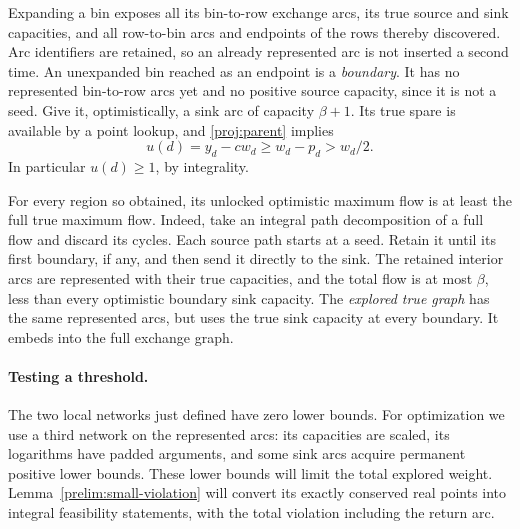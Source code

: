 Expanding a bin exposes all its bin-to-row exchange arcs, its true
source and sink capacities, and all row-to-bin arcs and endpoints of
the rows thereby discovered.  Arc identifiers are retained, so an
already represented arc is not inserted a second time.  An
unexpanded bin reached as an endpoint is a \emph{boundary}.  It has
no represented bin-to-row arcs yet and no positive source capacity,
since it is not a seed.  Give it, optimistically, a sink arc of
capacity \(\beta+1\).  Its true spare is available by a point lookup,
and \eqref{proj:parent} implies
\begin{equation}
\label{proj:boundary-spare}
            u(d)=y_d-cw_d\ge w_d-p_d>w_d/2 .
\end{equation}
In particular \(u(d)\ge1\), by integrality.

For every region so obtained, its unlocked optimistic maximum flow
is at least the full true maximum flow.  Indeed, take an integral
path decomposition of a full flow and discard its cycles.  Each
source path starts at a seed.  Retain it until its first boundary,
if any, and then send it directly to the sink.  The retained
interior arcs are represented with their true capacities, and the
total flow is at most \(\beta\), less than every optimistic boundary
sink capacity.  The \emph{explored true graph} has the same represented
arcs, but uses the true sink capacity at every boundary.  It embeds
into the full exchange graph.

\paragraph{Testing a threshold.}
The two local networks just defined have zero lower bounds.
For optimization we use a third network on the represented arcs:
its capacities are scaled, its logarithms have padded arguments,
and some sink arcs acquire permanent positive lower bounds.
These lower bounds will limit the total explored weight.
Lemma~\ref{prelim:small-violation} will convert its exactly
conserved real points into integral feasibility statements, with
the total violation including the return arc.


